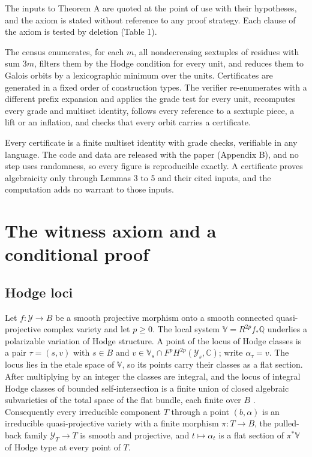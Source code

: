 \documentclass[10pt,twocolumn]{article}
\begin{document}
The inputs to Theorem A are quoted at the point of use with their
hypotheses, and the axiom is stated without reference to any proof
strategy. Each clause of the axiom is tested by deletion (Table 1).

The census enumerates, for each \(m\), all nondecreasing sextuples of
residues with sum \(3m\), filters them by the Hodge condition for every
unit, and reduces them to Galois orbits by a lexicographic minimum over
the units. Certificates are generated in a fixed order of construction
types. The verifier re-enumerates with a different prefix expansion and
applies the grade test for every unit, recomputes every grade and
multiset identity, follows every reference to a sextuple piece, a lift
or an inflation, and checks that every orbit carries a certificate.

Every certificate is a finite multiset identity with grade checks,
verifiable in any language. The code and data are released with the
paper (Appendix B), and no step uses randomness, so every figure is
reproducible exactly. A certificate proves algebraicity only through
Lemmas 3 to 5 and their cited inputs, and the computation adds no
warrant to those inputs.

\hypertarget{the-witness-axiom-and-a-conditional-proof}{%
\section{The witness axiom and a conditional
proof}\label{the-witness-axiom-and-a-conditional-proof}}

\hypertarget{hodge-loci}{%
\subsection{Hodge loci}\label{hodge-loci}}

Let \(f\colon\mathcal{Y}\to B\) be a smooth projective morphism onto a
smooth connected quasi-projective complex variety and let \(p\ge 0\).
The local system \(\mathbb{V}=R^{2p}f_*\mathbb{Q}\) underlies a
polarizable variation of Hodge structure. A point of the locus of Hodge
classes is a pair \(\tau=(s,v)\) with \(s\in B\) and
\(v\in\mathbb{V}_s\cap F^pH^{2p}(\mathcal{Y}_s,\mathbb{C})\); write
\(\alpha_\tau=v\). The locus lies in the
\textquotesingle etal\textquotesingle e space of \(\mathbb{V}\), so its
points carry their classes as a flat section. After multiplying by an
integer the classes are integral, and the locus of integral Hodge
classes of bounded self-intersection is a finite union of closed
algebraic subvarieties of the total space of the flat bundle, each
finite over \(B\) \cite{cdk1995}. Consequently every irreducible
component \(T\) through a point \((b,\alpha)\) is an irreducible
quasi-projective variety with a finite morphism \(\pi\colon T\to B\),
the pulled-back family \(\mathcal{Y}_T\to T\) is smooth and projective,
and \(t\mapsto\alpha_t\) is a flat section of \(\pi^*\mathbb{V}\) of
Hodge type at every point of \(T\).
\end{document}
